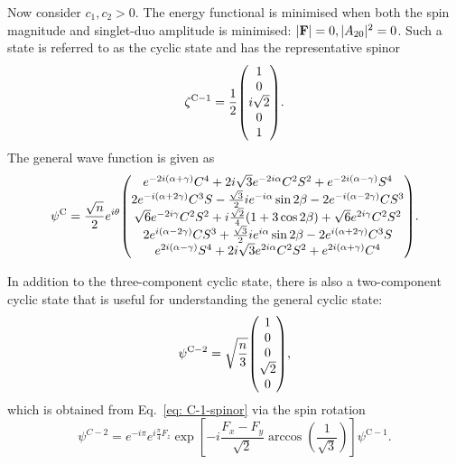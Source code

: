 Now consider \(c_1, c_2 > 0\).
The energy functional is minimised when both the spin magnitude and singlet-duo
amplitude is minimised: \(|\vb{F}| = 0, |A_{20}|^2=0\).
Such a state is referred to as the cyclic state and has the representative
spinor
\begin{equation}
    \zeta^\mathrm{C-1} = \frac{1}{2}\mqty(1 \\ 0 \\ i\sqrt{2} \\ 0 \\ 1).
    \label{eq: C-1-spinor}
\end{equation}
The general wave function is given as
\begin{equation}
    \psi^\mathrm{C} = \frac{\sqrt{n}}{2}e^{i\theta} \mqty(
        e^{-2i(\alpha+\gamma)}C^4 + 2i\sqrt{3}e^{-2i\alpha}C^2S^2
        + e^{-2i(\alpha-\gamma)}S^4
        \\
        2e^{-i(\alpha+2\gamma)}C^3S - \frac{\sqrt{3}}{2}ie^{-i\alpha}\sin 2\beta
        - 2e^{-i(\alpha-2\gamma)}CS^3
        \\
        \sqrt{6}e^{-2i\gamma}C^2S^2 + i\frac{\sqrt{2}}{4}(1+3\cos 2\beta)
        + \sqrt{6}e^{2i\gamma}C^2S^2
        \\
        2e^{i(\alpha-2\gamma)}CS^3 + \frac{\sqrt{3}}{2}ie^{i\alpha}\sin 2\beta
        - 2e^{i(\alpha+2\gamma)}C^3S
        \\
        e^{2i(\alpha-\gamma)}S^4 + 2i\sqrt{3}e^{2i\alpha}C^2S^2
        + e^{2i(\alpha+\gamma)}C^4
    ).
\end{equation}

In addition to the three-component cyclic state, there is also a two-component
cyclic state that is useful for understanding the general cyclic state:
\begin{equation}
    \psi^\mathrm{C-2} = \sqrt{\frac{n}{3}}\mqty(1  \\ 0 \\ 0 \\ \sqrt{2} \\ 0),
\end{equation}
which is obtained from Eq.~\eqref{eq: C-1-spinor} via the spin rotation
\begin{equation}
    \psi^{C-2} = e^{-i\pi}e^{i\frac{\pi}{4}F_z}
    \exp\left[-i\frac{F_x-F_y}{\sqrt{2}}
    \arccos{\left(\frac{1}{\sqrt{3}}\right)}\right]\psi^\mathrm{C-1}.
\end{equation}


